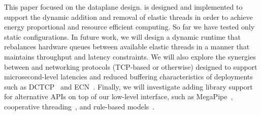  This paper focused on the \ix dataplane
design. \ix is designed and implemented to support the dynamic
addition and removal of elastic threads in order to achieve energy
proportional and resource efficient computing. So far we have tested
only static configurations. In future work, we will design a dynamic
runtime that rebalances hardware queues between available elastic
threads in a manner that maintains throughput and latency constraints.
We will also explore the synergies between \ix and networking
protocols (TCP-based or otherwise) designed to support microsecond-level latencies and reduced
buffering characteristics of \ix deployments such as
DCTCP~\cite{DBLP:conf/sigcomm/AlizadehGMPPPSS10} and
ECN~\cite{ramakrishnan2001addition}. Finally, we will investigate 
adding library support for alternative APIs on top of our low-level interface, such as
MegaPipe~\cite{DBLP:conf/osdi/HanMCR12}, cooperative
threading~\cite{DBLP:conf/sosp/BehrenCZNB03}, and rule-based
models~\cite{DBLP:conf/hotos/StutsmanO13}.

